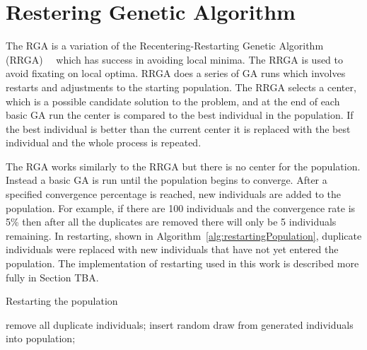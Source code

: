 \section{Restering Genetic Algorithm}

The RGA is a variation of the Recentering-Restarting Genetic Algorithm (RRGA)~\cite{hughes2013recentering}~\cite{hughes2013edit} which has success in avoiding local minima. The RRGA is used to avoid fixating on local optima. RRGA does a series of GA runs which involves restarts and adjustments to the starting population. The RRGA selects a center, which is a possible candidate solution to the problem, and at the end of each basic GA run the center is compared to the best individual in the population. If the best individual is better than the current center it is replaced with the best individual and the whole process is repeated.

The RGA works similarly to the RRGA but there is no center for the population. Instead a basic GA is run until the population begins to converge. After a specified convergence percentage is reached, new individuals are added to the population. For example, if there are 100 individuals and the convergence rate is 5\% then after all the duplicates are removed there will only be 5 individuals remaining. In restarting, shown in Algorithm~\ref{alg:restartingPopulation}, duplicate individuals were replaced with new individuals that have not yet entered the population. The implementation of restarting used in this work is described more fully in Section TBA.

\begin{algorithm}[H]
\caption{Restarting the population}
\label{alg:restartingPopulation}
\begin{algorithmic}

  \STATE remove all duplicate individuals;
    \STATE insert random draw from generated individuals into population;
  \ENDWHILE
\ENDIF

\end{algorithmic}
\end{algorithm}